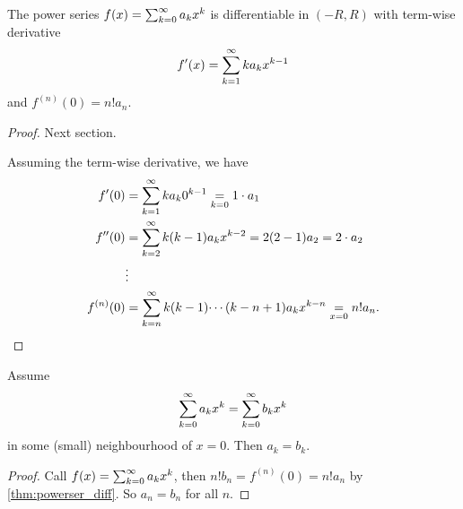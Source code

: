 \begin{theorem}\label{thm:powerser_diff}
    The power series $f(x) = \infsumo a_kx ^ k$ is differentiable in $(-R, R)$ with term-wise derivative
    \[
    f'(x) = \infsum ka_kx ^ {k - 1}
    \]
    and $f ^ {(n)}(0) = n!a_n$.
\end{theorem}
\begin{proof}
    Next section.
    
    Assuming the term-wise derivative,
    we have
    \begin{align*}
        f'(0) &= \infsum ka_k0 ^ {k - 1} \underset{k = 0}{=} 1 \cdot a_1 \\
        f''(0) &= \infsum[k = 2]k(k - 1)a_kx ^ {k - 2} = 2(2 - 1)a_2 = 2 \cdot a_2 \\
        &\vdots \\
        f ^ {(n)}(0) &= \infsum[k = n]k(k - 1) \dotsi (k - n + 1)a_kx ^ {k - n} \underset{x = 0}{=} n!a_n.
    \end{align*}
\end{proof}

\begin{theorem}\label{thm:iden_pow_series}
    Assume
    \[
    \infsumo a_kx ^ k = \infsumo b_kx ^ k
    \]
    in some
    (small)
    neighbourhood of $x = 0$.
    Then $a_k = b_k$.
\end{theorem}
\begin{proof}
    Call $f(x) = \infsumo a_kx ^ k$,
    then $n!b_n = f ^ {(n)}(0) = n!a_n$ by \autoref{thm:powerser_diff}.
    So $a_n = b_n$ for all $n$.
\end{proof}

